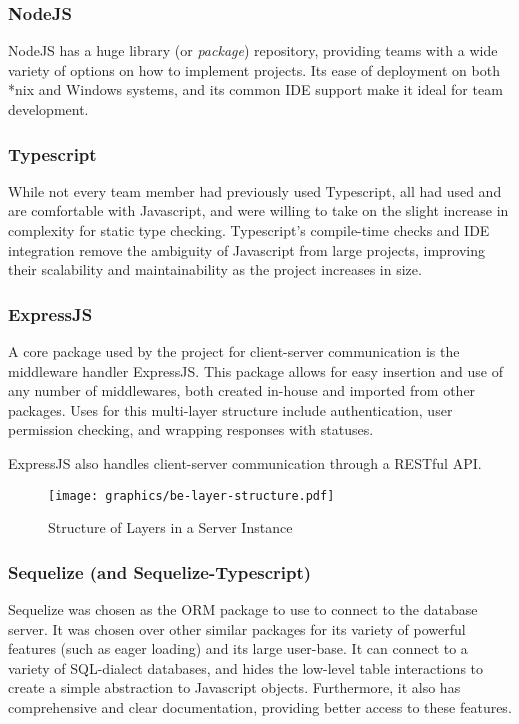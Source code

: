\documentclass{article}
\begin{document}
\subsubsection{NodeJS}
NodeJS has a huge library (or \emph{package}) repository, providing teams with a wide variety of options on how to implement projects. Its ease of deployment on both *nix and Windows systems,
and its common IDE support make it ideal for team development.

\subsubsection{Typescript}
While not every team member had previously used Typescript, all had used and are comfortable
with Javascript, and were willing to take on the slight increase in complexity for static
type checking. Typescript's compile-time checks and IDE integration remove the ambiguity of
Javascript from large projects, improving their scalability and maintainability as the project
increases in size.

\subsubsection{ExpressJS}
A core package used by the project for client-server communication is the middleware handler
ExpressJS. This package allows for easy insertion and use of any number of middlewares, both created in-house
and imported from other packages. Uses for this multi-layer structure include authentication, user
permission checking, and wrapping responses with statuses.

ExpressJS also handles client-server communication through a RESTful API.

\begin{figure}[H]
    \centering
    \texttt{[image: graphics/be-layer-structure.pdf]}
    \caption{Structure of Layers in a Server Instance}
    \label{fig:layer}
\end{figure}

\subsubsection{Sequelize (and Sequelize-Typescript)}
Sequelize was chosen as the ORM package to use to connect to the database server. It was chosen over other
similar packages for its variety of powerful features (such as eager loading) and its large user-base.
It can connect to a variety of SQL-dialect databases, and hides the low-level table interactions to create
a simple abstraction to Javascript objects.
Furthermore, it also has comprehensive and clear documentation, providing better access to these features.
\end{document}
